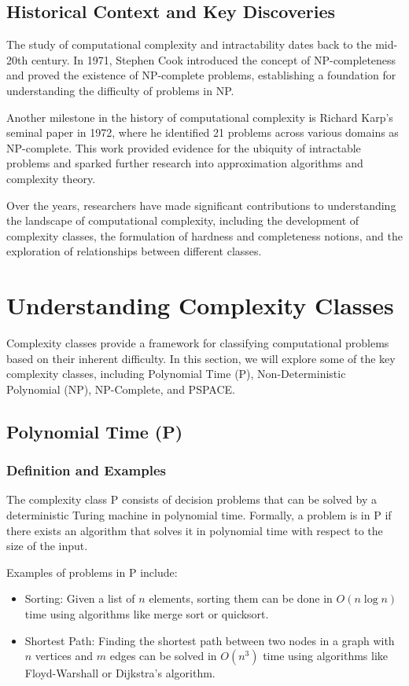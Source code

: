 \documentclass[12pt]{book} %
\begin{document}
\subsection{Historical Context and Key Discoveries}
The study of computational complexity and intractability dates back to the mid-20th century. In 1971, Stephen Cook introduced the concept of NP-completeness and proved the existence of NP-complete problems, establishing a foundation for understanding the difficulty of problems in NP.

Another milestone in the history of computational complexity is Richard Karp's seminal paper in 1972, where he identified 21 problems across various domains as NP-complete. This work provided evidence for the ubiquity of intractable problems and sparked further research into approximation algorithms and complexity theory.

Over the years, researchers have made significant contributions to understanding the landscape of computational complexity, including the development of complexity classes, the formulation of hardness and completeness notions, and the exploration of relationships between different classes.


\section{Understanding Complexity Classes}

Complexity classes provide a framework for classifying computational problems based on their inherent difficulty. In this section, we will explore some of the key complexity classes, including Polynomial Time (P), Non-Deterministic Polynomial (NP), NP-Complete, and PSPACE.

\subsection{Polynomial Time (P)}

\subsubsection{Definition and Examples}
The complexity class P consists of decision problems that can be solved by a deterministic Turing machine in polynomial time. Formally, a problem is in P if there exists an algorithm that solves it in polynomial time with respect to the size of the input.

Examples of problems in P include:
\begin{itemize}
    \item Sorting: Given a list of \(n\) elements, sorting them can be done in \(O(n \log n)\) time using algorithms like merge sort or quicksort.

\item Shortest Path: Finding the shortest path between two nodes in a graph with \(n\) vertices and \(m\) edges can be solved in \(O(n^3)\) time using algorithms like Floyd-Warshall or Dijkstra's algorithm.
\end{itemize}
\end{document}
